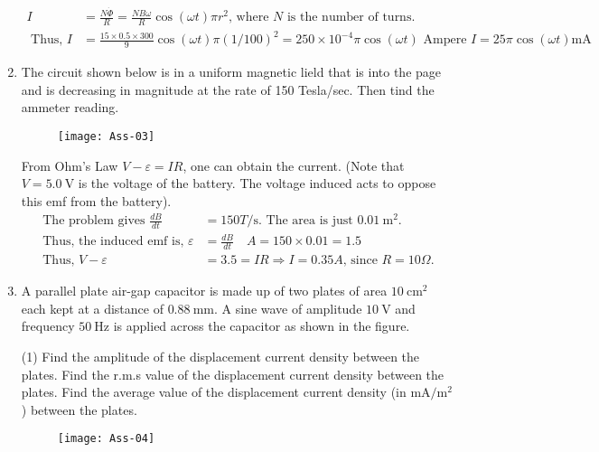 \begin{enumerate}
\begin{answer}
\begin{align*}
	I&=\frac{N \dot{\Phi}}{R}=\frac{N B \omega}{R} \cos (\omega t) \pi r^{2} \text {, where } N \text { is the number of turns. }\\
	\text { Thus, } I&=\frac{15 \times 0.5 \times 300}{9} \cos (\omega t) \pi(1 / 100)^{2}=250 \times 10^{-4} \pi \cos (\omega t) \text { Ampere }I=25 \pi \cos (\omega t) \mathrm{mA}
	\end{align*}
\end{answer}
	\item The circuit shown below is in a uniform magnetic lield that is into the page and is decreasing in magnitude at the rate of 150 Tesla/sec. Then tind the ammeter reading.
	\begin{figure}[H]
		\centering
		\texttt{[image: Ass-03]}
	\end{figure}
\begin{answer}
 From Ohm's Law $V-\varepsilon=I R$, one can obtain the current. (Note that $V=5.0 \mathrm{~V}$ is the voltage of the battery. The voltage induced acts to oppose this emf from the battery).
	\begin{align*}
	\text { The problem gives } \frac{d B}{d t}&=150 T / \mathrm{s} \text {. The area is just } 0.01 \mathrm{~m}^{2} \text {. }\\
	\text { Thus, the induced emf is, } \varepsilon&=\frac{d B}{d t} \quad A=150 \times 0.01=1.5\\
	\text { Thus, } V-\varepsilon&=3.5=I R \Rightarrow I=0.35 A \text {, since } R=10 \Omega \text {. }
	\end{align*}
\end{answer}
	\item A parallel plate air-gap capacitor is made up of two plates of area $10 \mathrm{~cm}^{2}$ each kept at a distance of $0.88 \mathrm{~mm}$. A sine wave of amplitude $10 \mathrm{~V}$ and frequency $50 \mathrm{~Hz}$ is applied across the capacitor as shown in the figure.
	\begin{tasks}(1)
		\task[\textbf{a.}]Find the amplitude of the displacement current density between the plates.
		\task[\textbf{b.}]
		 Find the r.m.s value of the displacement current density between the plates.
		\task[\textbf{c.}]Find the average value of the displacement current density (in $\mathrm{mA} / \mathrm{m}^{2}$ ) between the plates.
	\end{tasks}
	\begin{figure}[H]
		\centering
		\texttt{[image: Ass-04]}
	\end{figure}
\begin{answer}

\end{answer}
\end{enumerate}
